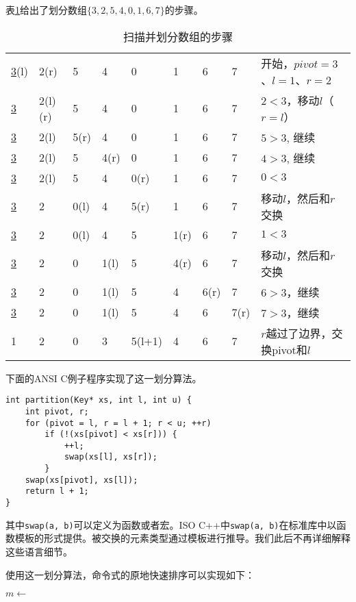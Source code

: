 \documentclass{ctexart}
\begin{document}
表\ref{tab:partition-steps}给出了划分数组$\{ 3, 2, 5, 4, 0, 1, 6, 7\}$的步骤。

\begin{table}[htbp]
\centering
\begin{tabular}{|llllllll|l|}
\hline
\underline{3}(l)  & 2(r) & 5 & 4 & 0 & 1 & 6 & 7 & 开始，$pivot = 3$、$l = 1$、$r = 2$ \\
\underline{3} & 2(l)(r) & 5 & 4 & 0 & 1 & 6 & 7 & $2 < 3$，移动$l$（$r=l$）\\
\underline{3} & 2(l) & 5(r) & 4 & 0 & 1 & 6 & 7 & $5 > 3$, 继续 \\
\underline{3} & 2(l) & 5 & 4(r) & 0 & 1 & 6 & 7 & $4 > 3$, 继续 \\
\underline{3} & 2(l) & 5 & 4 & 0(r) & 1 & 6 & 7 & $0 < 3$ \\
\underline{3} & 2 & 0(l) & 4 & 5(r) & 1 & 6 & 7 & 移动$l$，然后和$r$交换 \\
\underline{3} & 2 & 0(l) & 4 & 5 & 1(r) & 6 & 7 & $1 < 3$ \\
\underline{3} & 2 & 0 & 1(l) & 5 & 4(r) & 6 & 7 & 移动$l$，然后和$r$交换 \\
\underline{3} & 2 & 0 & 1(l) & 5 & 4 & 6(r) & 7 & $6 > 3$，继续 \\
\underline{3} & 2 & 0 & 1(l) & 5 & 4 & 6 & 7(r) & $7 > 3$，继续 \\
1 & 2 & 0 & 3 & 5(l+1) & 4 & 6 & 7 & $r$越过了边界，交换pivot和$l$ \\
\hline
\end{tabular}
\caption{扫描并划分数组的步骤} \label{tab:partition-steps}
\end{table}

下面的ANSI C例子程序实现了这一划分算法。

\lstset{language=C}
\begin{lstlisting}
int partition(Key* xs, int l, int u) {
    int pivot, r;
    for (pivot = l, r = l + 1; r < u; ++r)
        if (!(xs[pivot] < xs[r])) {
            ++l;
            swap(xs[l], xs[r]);
        }
    swap(xs[pivot], xs[l]);
    return l + 1;
}
\end{lstlisting}

其中\texttt{swap(a, b)}可以定义为函数或者宏。ISO C++中\texttt{swap(a, b)}在标准库中以函数模板的形式提供。被交换的元素类型通过模板进行推导。我们此后不再详细解释这些语言细节。

使用这一划分算法，命令式的原地快速排序可以实现如下：

\begin{algorithmic}[1]
    \State $m \gets$ 
    \State {}
    \State {}
  \EndIf
\EndProcedure
\end{algorithmic}
\end{document}
